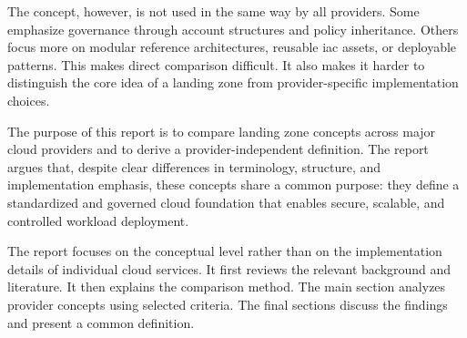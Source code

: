 The concept, however, is not used in the same way by all providers. Some emphasize governance through account structures and policy inheritance. Others focus more on modular reference architectures, reusable \ac{iac} assets, or deployable patterns. This makes direct comparison difficult. It also makes it harder to distinguish the core idea of a landing zone from provider-specific implementation choices.

The purpose of this report is to compare landing zone concepts across major cloud providers and to derive a provider-independent definition. The report argues that, despite clear differences in terminology, structure, and implementation emphasis, these concepts share a common purpose: they define a standardized and governed cloud foundation that enables secure, scalable, and controlled workload deployment.

The report focuses on the conceptual level rather than on the implementation details of individual cloud services. It first reviews the relevant background and literature. It then explains the comparison method. The main section analyzes provider concepts using selected criteria. The final sections discuss the findings and present a common definition.